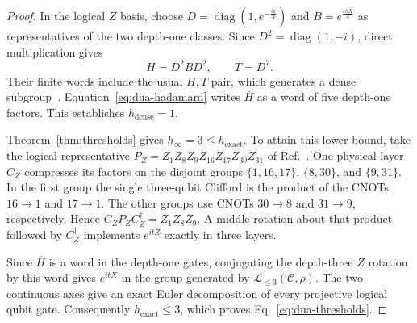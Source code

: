 \documentclass[aps,prl,reprint,notitlepage,nofootinbib,nobibnotes]{revtex4-2}
\begin{document}
\begin{proof}
In the logical $Z$ basis, choose $D=\operatorname{diag}(1,e^{-\frac{i\pi}{4}})$ and
$B=e^{\frac{i\pi\overline X}{4}}$ as representatives of the two depth-one classes. Since
$D^2=\operatorname{diag}(1,-i)$, direct multiplication gives
\begin{equation}\label{eq:dua-hadamard}
 \overline H=D^2BD^2,\qquad \overline T=D^7 .
\end{equation}
Their finite words include the usual $H,T$ pair, which generates a dense subgroup~\cite{Boykin}.
Equation~\eqref{eq:dua-hadamard} writes $\overline H$ as a word of five depth-one factors. This
establishes $h_{\mathrm{dense}}=1$.

Theorem~\ref{thm:thresholds} gives $h_\infty=3\le h_{\mathrm{exact}}$. To attain this lower bound,
take the logical representative $P_Z=Z_1Z_8Z_9Z_{16}Z_{17}Z_{30}Z_{31}$ of Ref.~\cite[App.~B.1,
Eq.~(33)]{Dua}. One physical layer $C_Z$ compresses its factors on the disjoint groups
$\{1,16,17\}$, $\{8,30\}$, and $\{9,31\}$. In the first group the single three-qubit Clifford is
the product of the CNOTs $16\to1$ and $17\to1$. The other groups use CNOTs $30\to8$ and $31\to9$,
respectively. Hence $C_ZP_ZC_Z^\dagger=Z_1Z_8Z_9$. A middle rotation about that product followed by
$C_Z^\dagger$ implements $e^{it\overline Z}$ exactly in three layers.

Since $\overline H$ is a word in the depth-one gates, conjugating the depth-three $Z$ rotation by
this word gives $e^{it\overline X}$ in the group generated by $\mathcal L_{\le3}(\mathcal C,\rho)$.
The two continuous axes give an exact Euler decomposition of every projective logical qubit gate.
Consequently $h_{\mathrm{exact}}\le3$, which proves Eq.~\eqref{eq:dua-thresholds}.
\end{proof}
\end{document}
